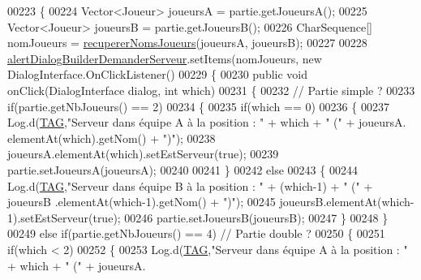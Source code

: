 \begin{DoxyCode}
00223     \{
00224         Vector<Joueur> joueursA = partie.getJoueursA();
00225         Vector<Joueur> joueursB = partie.getJoueursB();
00226         CharSequence[] nomJoueurs = \hyperlink{classcom_1_1example_1_1area_1_1_i_h_m_gestion_rencontre_ae68b1e5d73d33d01e622a736a25da731}{recupererNomsJoueurs}(joueursA, joueursB);
00227 
00228         \hyperlink{classcom_1_1example_1_1area_1_1_i_h_m_gestion_rencontre_a47ed7018b2af1ac9197715b9008a34a5}{alertDialogBuilderDemanderServeur}.setItems(nomJoueurs, \textcolor{keyword}{new} 
      DialogInterface.OnClickListener()
00229         \{
00230             \textcolor{keyword}{public} \textcolor{keywordtype}{void} onClick(DialogInterface dialog, \textcolor{keywordtype}{int} which)
00231             \{
00232                 \textcolor{comment}{// Partie simple ?}
00233                 \textcolor{keywordflow}{if}(partie.getNbJoueurs() == 2)
00234                 \{
00235                     \textcolor{keywordflow}{if}(which == 0)
00236                     \{
00237                         Log.d(\hyperlink{classcom_1_1example_1_1area_1_1_i_h_m_gestion_rencontre_a0ac4d9152d48619cd697c8c69166219f}{TAG},\textcolor{stringliteral}{"Serveur dans équipe A à la position : "} + which + \textcolor{stringliteral}{" ("} + joueursA.
      elementAt(which).getNom() + \textcolor{stringliteral}{")"});
00238                         joueursA.elementAt(which).setEstServeur(\textcolor{keyword}{true});
00239                         partie.setJoueursA(joueursA);
00240 
00241                     \}
00242                     \textcolor{keywordflow}{else}
00243                     \{
00244                         Log.d(\hyperlink{classcom_1_1example_1_1area_1_1_i_h_m_gestion_rencontre_a0ac4d9152d48619cd697c8c69166219f}{TAG},\textcolor{stringliteral}{"Serveur dans équipe B à la position : "} + (which-1) + \textcolor{stringliteral}{" ("} + joueursB
      .elementAt(which-1).getNom() + \textcolor{stringliteral}{")"});
00245                         joueursB.elementAt(which-1).setEstServeur(\textcolor{keyword}{true});
00246                         partie.setJoueursB(joueursB);
00247                     \}
00248                 \}
00249                 \textcolor{keywordflow}{else} \textcolor{keywordflow}{if}(partie.getNbJoueurs() == 4) \textcolor{comment}{// Partie double ?}
00250                 \{
00251                     \textcolor{keywordflow}{if}(which < 2)
00252                     \{
00253                         Log.d(\hyperlink{classcom_1_1example_1_1area_1_1_i_h_m_gestion_rencontre_a0ac4d9152d48619cd697c8c69166219f}{TAG},\textcolor{stringliteral}{"Serveur dans équipe A à la position : "} + which + \textcolor{stringliteral}{" ("} + joueursA.

\end{DoxyCode}
